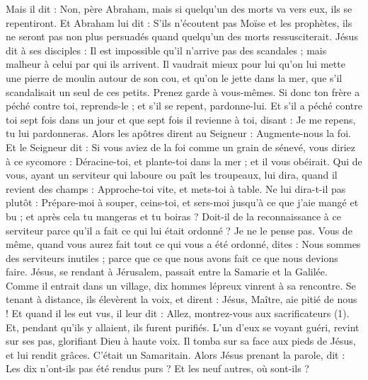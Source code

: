 \begin{multicols}{2}
Mais il dit : Non, père Abraham, mais si quelqu'un des morts va vers eux, ils se repentiront.
Et Abraham lui dit : S’ils n'écoutent pas Moïse et les prophètes, ils ne seront pas non plus persuadés quand quelqu'un des morts ressusciterait.
\VerseOne{}Jésus dit à ses disciples : Il est impossible qu'il n'arrive pas des scandales ; mais malheur à celui par qui ils arrivent.
Il vaudrait mieux pour lui qu'on lui mette une pierre de moulin autour de son cou, et qu’on le jette dans la mer, que s’il scandalisait un seul de ces petits.
Prenez garde à vous-mêmes. Si donc ton frère a péché contre toi, reprends-le ; et s'il se repent, pardonne-lui.
Et s’il a péché contre toi sept fois dans un jour et que sept fois il revienne à toi, disant : Je me repens, tu lui pardonneras.
Alors les apôtres dirent au Seigneur : Augmente-nous la foi.
Et le Seigneur dit : Si vous aviez de la foi comme un grain de sénevé, vous diriez à ce sycomore : Déracine-toi, et plante-toi dans la mer ; et il vous obéirait.
Qui de vous, ayant un serviteur qui laboure ou paît les troupeaux, lui dira, quand il revient des champs : Approche-toi vite, et mets-toi à table.
Ne lui dira-t-il pas plutôt : Prépare-moi à souper, ceins-toi, et sers-moi jusqu'à ce que j'aie mangé et bu ; et après cela tu mangeras et tu boiras ?
Doit-il de la reconnaissance à ce serviteur parce qu’il a fait ce qui lui était ordonné ? Je ne le pense pas.
Vous de même, quand vous aurez fait tout ce qui vous a été ordonné, dites : Nous sommes des serviteurs inutiles ; parce que ce que nous avons fait ce que nous devions faire.
Jésus, se rendant à Jérusalem, passait entre la Samarie et la Galilée.
Comme il entrait dans un village, dix hommes lépreux vinrent à sa rencontre. Se tenant à distance, ils élevèrent la voix, et dirent :
Jésus, Maître, aie pitié de nous !
Et quand il les eut vus, il leur dit : Allez, montrez-vous aux sacrificateurs (1). Et, pendant qu’ils y allaient, ils furent purifiés.
L’un d'eux se voyant guéri, revint sur ses pas, glorifiant Dieu à haute voix.
Il tomba sur sa face aux pieds de Jésus, et lui rendit grâces. C’était un Samaritain.
Alors Jésus prenant la parole, dit : Les dix n'ont-ils pas été rendus purs ? Et les neuf autres, où sont-ils ?

\end{multicols}
